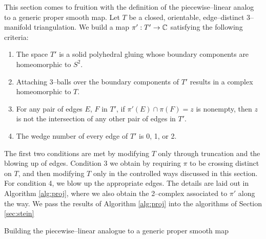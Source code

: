 This section comes to fruition with the definition of the piecewise--linear analog to a generic proper smooth map.
Let $T$ be a closed, orientable, edge--distinct 3--manifold triangulation.
We build a map $\pi':T'\to\mathbb{C}$ satisfying the following criteria:
\begin{enumerate}
	\item The space $T'$ is a solid polyhedral gluing whose boundary components are homeomorphic to $S^2$.
	\item Attaching 3--balls over the boundary components of $T'$ results in a complex homeomorphic to $T$.
	\item For any pair of edges $E$, $F$ in $T'$, if $\pi'(E)\cap\pi(F)=z$ is nonempty, then $z$ is not the intersection of any other pair of edges in $T'$.
	\item The wedge number of every edge of $T'$ is 0, 1, or 2.
\end{enumerate}
The first two conditions are met by modifying $T$ only through truncation and the blowing up of edges.
Condition 3 we obtain by requiring $\pi$ to be crossing distinct on $T$, and then modifying $T$ only in the controlled ways discussed in this section.
For condition 4, we blow up the appropriate edges.
The details are laid out in Algorithm \ref{alg:proj}, where we also obtain the 2--complex associated to $\pi'$ along the way.
We pass the results of Algorithm \ref{alg:proj} into the algorithms of Section \ref{sec:stein}

\begin{algorithm}[H]
	\caption{Building the piecewise--linear analogue to a generic proper smooth map}
	\label{alg:proj}
\end{algorithm}